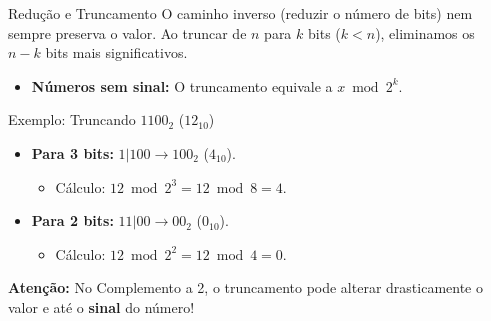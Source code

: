 \begin{frame}{Redução e Truncamento}
    O caminho inverso (reduzir o número de bits) nem sempre preserva o valor. Ao truncar de $n$ para $k$ bits ($k < n$), eliminamos os $n-k$ bits mais significativos.

    \begin{itemize}
        \item \textbf{Números sem sinal:} O truncamento equivale a $x \bmod 2^k$.
    \end{itemize}

    \begin{exampleblock}{Exemplo: Truncando $1100_2$ ($12_{10}$)}
        \begin{itemize}
            \item \textbf{Para 3 bits:} $1|100 \rightarrow 100_2$ ($4_{10}$).
                  \begin{itemize}
                      \item Cálculo: $12 \bmod 2^3 = 12 \bmod 8 = 4$.
                  \end{itemize}
            \item \textbf{Para 2 bits:} $11|00 \rightarrow 00_2$ ($0_{10}$).
                  \begin{itemize}
                      \item Cálculo: $12 \bmod 2^2 = 12 \bmod 4 = 0$.
                  \end{itemize}
        \end{itemize}
    \end{exampleblock}

    \textbf{Atenção:} No Complemento a 2, o truncamento pode alterar drasticamente o valor e até o \textbf{sinal} do número!
\end{frame}


